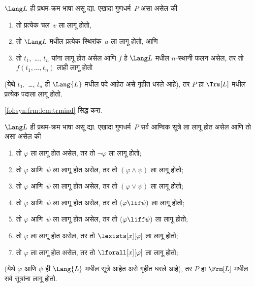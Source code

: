 \begin{lem}
    \label{fol:syn:frm:lem:trmind}
    $\Lang L$ ही प्रथम-क्रम भाषा असू द्या.
    एखादा गुणधर्म~$P$ असा असेल की

    \begin{enumerate}
        \item तो प्रत्येक चल~$v$ ला लागू होतो,

        \item तो $\Lang L$ मधील प्रत्येक स्थिरांक~$a$ ला लागू होतो, आणि

        \item तो $t_1$,~\dots, $t_n$ यांना लागू होत असेल आणि $f$ हे
        $\Lang L$ मधील $n$-स्थानी फलन असेल, तर तो
        $f(t_1,\dotsc,t_n)$ लाही लागू होतो
    \end{enumerate}
    (येथे $t_1$,~\dots, $t_n$ ही $\Lang{L}$ मधील पदे आहेत असे गृहीत धरले आहे),
    तर $P$ हा $\Trm[L]$ मधील प्रत्येक पदाला लागू होतो.
\end{lem}

\begin{prob}
    \ref{fol:syn:frm:lem:trmind} सिद्ध करा.
\end{prob}

\begin{lem}
    \label{fol:syn:frm:thm:frmind}
    $\Lang L$ ही प्रथम-क्रम भाषा असू द्या.
    एखादा गुणधर्म~$P$ सर्व आण्विक सूत्रे ला लागू होत असेल आणि तो असा असेल की

    \begin{enumerate}
        \item तो $\varphi$ ला लागू होत असेल, तर तो $\lnot \varphi$ ला
            लागू होतो;
        \item तो $\varphi$ आणि~$\psi$ ला लागू होत असेल, तर तो
            $(\varphi \land \psi)$ ला लागू होतो;
        \item तो $\varphi$ आणि~$\psi$ ला लागू होत असेल, तर तो
            $(\varphi \lor \psi)$ ला लागू होतो;
        \item तो $\varphi$ आणि~$\psi$ ला लागू होत असेल, तर तो
            $(\varphi \lif \psi)$ ला लागू होतो;
        \item तो $\varphi$ आणि~$\psi$ ला लागू होत असेल, तर तो
            $(\varphi \liff \psi)$ ला लागू होतो;
        \item तो $\varphi$ ला लागू होत असेल, तर तो
            $\lexists[x][\varphi]$ ला लागू होतो;
        \item तो $\varphi$ ला लागू होत असेल, तर तो
            $\lforall[x][\varphi]$ ला लागू होतो;
  \end{enumerate}
  (येथे $\varphi$ आणि $\psi$ ही $\Lang{L}$ मधील सूत्रे आहेत असे गृहीत धरले आहे),
  तर $P$ हा $\Frm[L]$ मधील सर्व सूत्रांना लागू होतो.
\end{lem}












